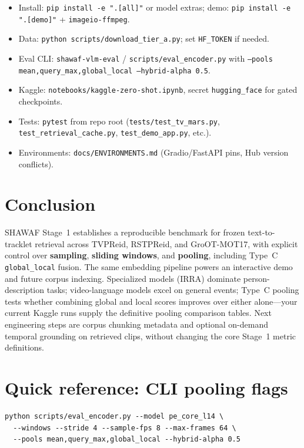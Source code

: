 \documentclass[11pt,a4paper]{article}
\begin{document}
\begin{itemize}[noitemsep]
  \item Install: \texttt{pip install -e ".[all]"} or model extras; demo: \texttt{pip install -e ".[demo]"} + \texttt{imageio-ffmpeg}.
  \item Data: \texttt{python scripts/download\_tier\_a.py}; set \texttt{HF\_TOKEN} if needed.
  \item Eval CLI: \texttt{shawaf-vlm-eval} / \texttt{scripts/eval\_encoder.py} with \texttt{--pools mean,query\_max,global\_local --hybrid-alpha 0.5}.
  \item Kaggle: \texttt{notebooks/kaggle-zero-shot.ipynb}, secret \texttt{hugging\_face} for gated checkpoints.
  \item Tests: \texttt{pytest} from repo root (\texttt{tests/test\_tv\_mars.py}, \texttt{test\_retrieval\_cache.py}, \texttt{test\_demo\_app.py}, etc.).
  \item Environments: \texttt{docs/ENVIRONMENTS.md} (Gradio/FastAPI pins, Hub version conflicts).
\end{itemize}

\section{Conclusion}

SHAWAF Stage~1 establishes a reproducible benchmark for frozen text-to-tracklet retrieval across TVPReid, RSTPReid, and GroOT-MOT17, with explicit control over \textbf{sampling}, \textbf{sliding windows}, and \textbf{pooling}, including Type~C \texttt{global\_local} fusion.
The same embedding pipeline powers an interactive demo and future corpus indexing.
Specialized models (IRRA) dominate person-description tasks; video-language models excel on general events; Type~C pooling tests whether combining global and local scores improves over either alone---your current Kaggle runs supply the definitive pooling comparison tables.
Next engineering steps are corpus chunking metadata and optional on-demand temporal grounding on retrieved clips, without changing the core Stage~1 metric definitions.

\appendix
\section{Quick reference: CLI pooling flags}
\begin{lstlisting}
python scripts/eval_encoder.py --model pe_core_l14 \
  --windows --stride 4 --sample-fps 8 --max-frames 64 \
  --pools mean,query_max,global_local --hybrid-alpha 0.5
\end{lstlisting}
\end{document}

